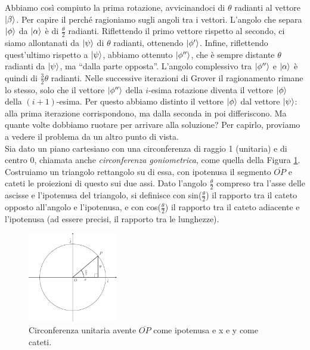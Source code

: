 \documentclass{book}
\theoremstyle{definition}
\theoremstyle{definition}
\theoremstyle{definition}
\theoremstyle{plain}
\theoremstyle{plain}
\theoremstyle{plain}
\theoremstyle{plain}
\begin{document}
Abbiamo così compiuto la prima rotazione, avvicinandoci di $\theta$ radianti al vettore $\ket{\beta}$. Per capire il perché ragioniamo sugli angoli tra i vettori. L'angolo che separa $\ket{\phi}$ da $\ket{\alpha}$ è di $\frac{\theta}{2}$ radianti. Riflettendo il primo vettore rispetto al secondo, ci siamo allontanati da $\ket{\psi}$ di $\theta$ radianti, ottenendo $\ket{\phi'}$. Infine, riflettendo quest'ultimo rispetto a $\ket{\psi}$, abbiamo ottenuto $\ket{\phi''}$, che è sempre distante $\theta$ radianti da $\ket{\psi}$, ma ``dalla parte opposta''. L'angolo complessivo tra $\ket{\phi''}$ e $\ket{\alpha}$ è quindi di $\frac{3}{2} \theta$ radianti.
Nelle successive iterazioni di Grover il ragionamento rimane lo stesso, solo che il vettore $\ket{\phi''}$ della $i$-esima rotazione diventa il vettore $\ket{\phi}$ della $(i+1)$-esima. Per questo abbiamo distinto il vettore $\ket{\phi}$ dal vettore $\ket{\psi}$: alla prima iterazione corrispondono, ma dalla seconda in poi differiscono. Ma quante volte dobbiamo ruotare per arrivare alla soluzione? Per capirlo, proviamo a vedere il problema da un altro punto di vista.\\
Sia dato un piano cartesiano con una circonferenza di raggio 1 (unitaria) e di centro 0, chiamata anche \emph{circonferenza goniometrica}, come quella della Figura \ref{fig:unitary_circumference}. Costruiamo un triangolo rettangolo su di essa, con ipotenusa il segmento $\overline{OP}$ e cateti le proiezioni di questo sui due assi. Dato l'angolo $\frac{\theta}{2}$ compreso tra l'asse delle ascisse e l'ipotenusa del triangolo, si definisce con sin($\frac{\theta}{2}$) il rapporto tra il cateto opposto all'angolo e l'ipotenusa, e con cos($\frac{\theta}{2}$) il rapporto tra il cateto adiacente e l'ipotenusa (ad essere precisi, il rapporto tra le lunghezze).
\begin{figure}[h!]
\captionsetup{font=scriptsize}
\begin{center}
    \includegraphics[width=0.35\textwidth]{Immagini troppo complicate/immagine1.1.pdf}
\end{center}
\caption{\scriptsize Circonferenza unitaria avente $\overline{OP}$ come ipotenusa e x e y come cateti.}\label{fig:unitary_circumference}
\end{figure} \\
\end{document}
